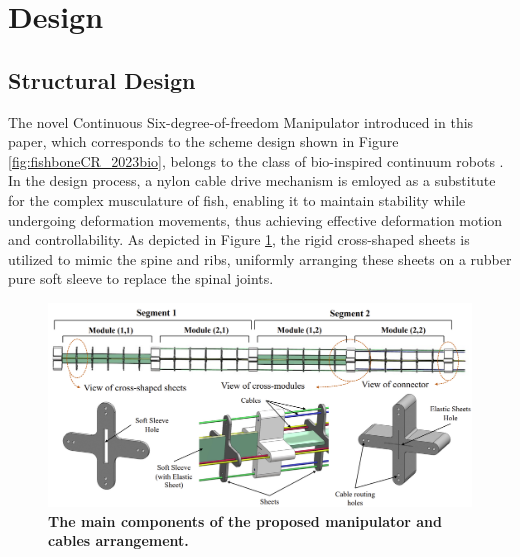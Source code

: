 \section{Design} 
\subsection{Structural Design} %
The novel Continuous Six-degree-of-freedom Manipulator introduced in this paper, which corresponds to the scheme design 
shown in Figure \ref{fig:fishboneCR_2023bio}, belongs to the class of bio-inspired continuum robots \cite{fishboneCR}. 
In the design process, a nylon cable drive mechanism is emloyed as a substitute for the complex musculature of fish, 
enabling it to maintain stability while undergoing deformation movements, thus achieving effective deformation motion 
and controllability. As depicted in Figure \ref{fig:main_components}, the rigid cross-shaped sheets is utilized to mimic 
the spine and ribs, uniformly arranging these sheets on a rubber pure soft sleeve to replace the spinal joints.
\begin{figure}[H] %
    \centering %
    \captionsetup{labelsep=colon}
    \includegraphics[width=1.0\textwidth]{Image/Design/main_component_of_manipulator.png} 
    \caption[The main components of the proposed manipulator and cables arrangement]
    {\centering \textbf{The main components of the proposed manipulator and cables arrangement.}}
    \label{fig:main_components}
\end{figure}
